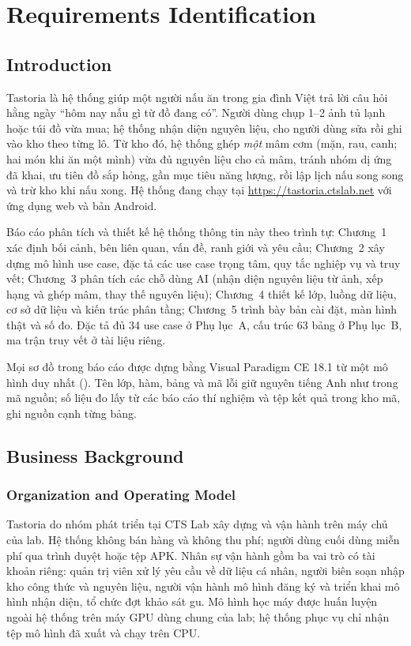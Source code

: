 \chapter{Requirements Identification}\label{c:req}

\section{Introduction}
Tastoria là hệ thống giúp một người nấu ăn trong gia đình Việt trả lời câu hỏi hằng ngày ``hôm nay nấu gì từ đồ đang có''. Người dùng chụp 1--2 ảnh tủ lạnh hoặc túi đồ vừa mua; hệ thống nhận diện nguyên liệu, cho người dùng sửa rồi ghi vào kho theo từng lô. Từ kho đó, hệ thống ghép \emph{một} mâm cơm (mặn, rau, canh; hai món khi ăn một mình) vừa đủ nguyên liệu cho cả mâm, tránh nhóm dị ứng đã khai, ưu tiên đồ sắp hỏng, gần mục tiêu năng lượng, rồi lập lịch nấu song song và trừ kho khi nấu xong. Hệ thống đang chạy tại \url{https://tastoria.ctslab.net} với ứng dụng web và bản Android.

Báo cáo phân tích và thiết kế hệ thống thông tin này theo trình tự: Chương~1 xác định bối cảnh, bên liên quan, vấn đề, ranh giới và yêu cầu; Chương~2 xây dựng mô hình use case, đặc tả các use case trọng tâm, quy tắc nghiệp vụ và truy vết; Chương~3 phân tích các chỗ dùng AI (nhận diện nguyên liệu từ ảnh, xếp hạng và ghép mâm, thay thế nguyên liệu); Chương~4 thiết kế lớp, luồng dữ liệu, cơ sở dữ liệu và kiến trúc phân tầng; Chương~5 trình bày bản cài đặt, màn hình thật và số đo. Đặc tả đủ 34 use case ở Phụ lục~A, cấu trúc 63 bảng ở Phụ lục~B, ma trận truy vết ở tài liệu riêng.

Mọi sơ đồ trong báo cáo được dựng bằng Visual Paradigm CE 18.1 từ một mô hình duy nhất (). Tên lớp, hàm, bảng và mã lỗi giữ nguyên tiếng Anh như trong mã nguồn; số liệu đo lấy từ các báo cáo thí nghiệm và tệp kết quả trong kho mã, ghi nguồn cạnh từng bảng.

\section{Business Background}
\subsection{Organization and Operating Model}
Tastoria do nhóm phát triển tại CTS Lab xây dựng và vận hành trên máy chủ của lab. Hệ thống không bán hàng và không thu phí; người dùng cuối dùng miễn phí qua trình duyệt hoặc tệp APK. Nhân sự vận hành gồm ba vai trò có tài khoản riêng: quản trị viên xử lý yêu cầu về dữ liệu cá nhân, người biên soạn nhập kho công thức và nguyên liệu, người vận hành mô hình đăng ký và triển khai mô hình nhận diện, tổ chức đợt khảo sát gu. Mô hình học máy được huấn luyện ngoài hệ thống trên máy GPU dùng chung của lab; hệ thống phục vụ chỉ nhận tệp mô hình đã xuất và chạy trên CPU.

